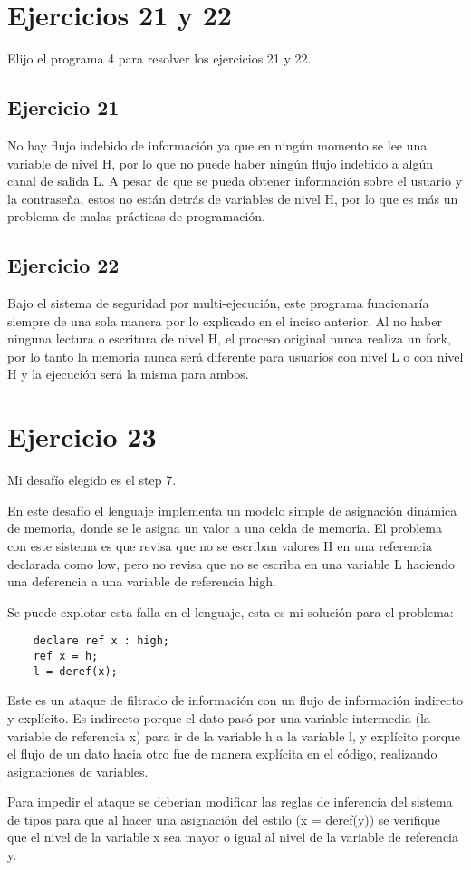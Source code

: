 \documentclass[11pt]{article}
\begin{document}
\section*{Ejercicios 21 y 22}
Elijo el programa 4 para resolver los ejercicios 21 y 22.
\subsection*{Ejercicio 21}
No hay flujo indebido de información ya que en ningún momento se lee una variable
de nivel H, por lo que no puede haber ningún flujo indebido a algún canal de salida L.
A pesar de que se pueda obtener información sobre el usuario y la contraseña, estos
no están detrás de variables de nivel H, por lo que es más un problema de malas
prácticas de programación. 
\subsection*{Ejercicio 22}
Bajo el sistema de seguridad por multi-ejecución, este programa funcionaría siempre
de una sola manera por lo explicado en el inciso anterior. Al no haber ninguna lectura
o escritura de nivel H, el proceso original nunca realiza un fork, por lo tanto
la memoria nunca será diferente para usuarios con nivel L o con nivel H y la
ejecución será la misma para ambos. 

\section*{Ejercicio 23}
Mi desafío elegido es el step 7. 

En este desafío el lenguaje implementa un 
modelo simple de asignación dinámica de memoria, donde se le asigna un valor a una celda
de memoria. El problema con este sistema es que revisa que no se escriban valores
H en una referencia declarada como low, pero no revisa que no se escriba en una
variable L haciendo una deferencia a una variable de referencia high. 

Se puede explotar esta falla en el lenguaje, esta es mi solución para el problema:
\begin{verbatim}
    declare ref x : high;
    ref x = h;
    l = deref(x);
\end{verbatim}

Este es un ataque de filtrado de información con un flujo de información 
indirecto y explícito. Es indirecto porque el dato
pasó por una variable intermedia (la variable de referencia x) para ir de la
variable h a la variable l, y explícito porque el flujo de un dato hacia otro
fue de manera explícita en el código, realizando asignaciones de variables.

Para impedir el ataque se deberían modificar las reglas de inferencia del sistema
de tipos para que al hacer una asignación del estilo (x = deref(y)) se verifique
que el nivel de la variable x sea mayor o igual al nivel de la variable de referencia y.
\end{document}
